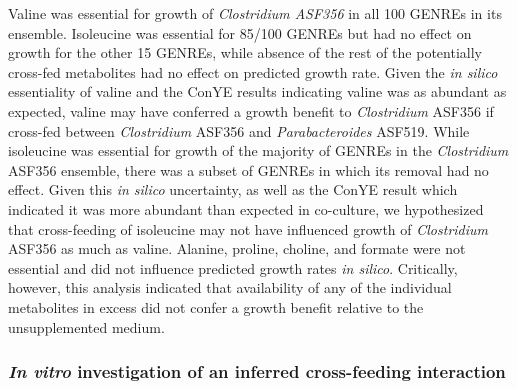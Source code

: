 \documentclass[11pt,twocolumn,notitlepage,openany,twoside]{book}
\begin{document}
\begin{refsection}
Valine was essential for growth of \textit{Clostridium ASF356} in all 100 GENREs in its ensemble. Isoleucine was essential for 85/100 GENREs but had no effect on growth for the other 15 GENREs, while absence of the rest of the potentially cross-fed metabolites had no effect on predicted growth rate. Given the \textit{in silico} essentiality of valine and the ConYE results indicating valine was as abundant as expected, valine may have conferred a growth benefit to \textit{Clostridium} ASF356 if cross-fed between \textit{Clostridium} ASF356 and \textit{Parabacteroides} ASF519. While isoleucine was essential for growth of the majority of GENREs in the \textit{Clostridium} ASF356 ensemble, there was a subset of GENREs in which its removal had no effect. Given this \textit{in silico} uncertainty, as well as the ConYE result which indicated it was more abundant than expected in co-culture, we hypothesized that cross-feeding of isoleucine may not have influenced growth of \textit{Clostridium} ASF356 as much as valine. Alanine, proline, choline, and formate were not essential and did not influence predicted growth rates \textit{in silico}. Critically, however, this analysis indicated that availability of any of the individual metabolites in excess did not confer a growth benefit relative to the unsupplemented medium.

\subsubsection{\textit{In vitro} investigation of an inferred cross-feeding interaction}


\end{refsection}
\end{document}
